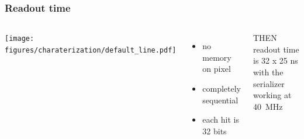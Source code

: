 \begin{frame}
\begin{columns}
        \end{columns}
    \end{frame}      

    \begin{frame}
        \frametitle{Readout time}
        \begin{columns}
                \texttt{[image: figures/charaterization/default\_line.pdf]}
            \begin{itemize}
                \item no memory on pixel
                \item completely sequential
                \item each hit is 32 bits
            \end{itemize}
            THEN readout time is 32 x 25 ns with the serializer working at \SI{40}{MHz}
        \end{columns}            
    \end{frame}          